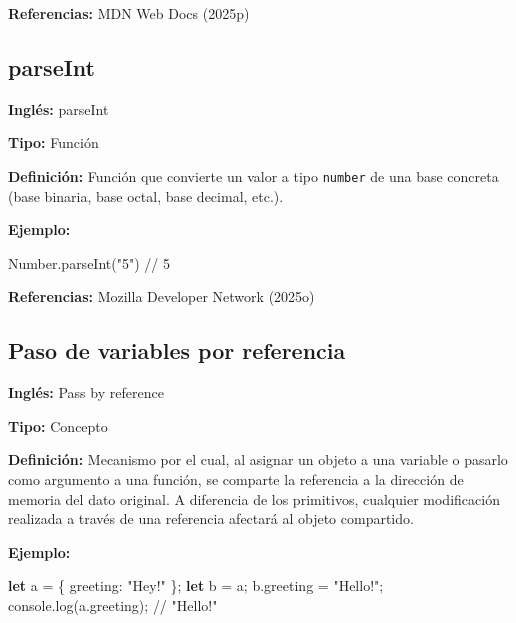 \documentclass[
  letterpaper,
  DIV=11,
  numbers=noendperiod]{scrreprt}
\newenvironment{Shaded}{\begin{snugshade}}{\end{snugshade}}
\newcommand{\AttributeTok}[1]{\textcolor[rgb]{0.40,0.45,0.13}{#1}}
\newcommand{\BuiltInTok}[1]{\textcolor[rgb]{0.00,0.23,0.31}{#1}}
\newcommand{\CommentTok}[1]{\textcolor[rgb]{0.37,0.37,0.37}{#1}}
\newcommand{\DataTypeTok}[1]{\textcolor[rgb]{0.68,0.00,0.00}{#1}}
\newcommand{\FunctionTok}[1]{\textcolor[rgb]{0.28,0.35,0.67}{#1}}
\newcommand{\KeywordTok}[1]{\textcolor[rgb]{0.00,0.23,0.31}{\textbf{#1}}}
\newcommand{\NormalTok}[1]{\textcolor[rgb]{0.00,0.23,0.31}{#1}}
\newcommand{\OperatorTok}[1]{\textcolor[rgb]{0.37,0.37,0.37}{#1}}
\newcommand{\StringTok}[1]{\textcolor[rgb]{0.13,0.47,0.30}{#1}}
\let\oldsubsection\subsection
\renewcommand{\subsection}{\phantomsection\oldsubsection}
\begin{document}
\textbf{Referencias:} MDN Web Docs (2025p)

\subsection*{parseInt}\label{glos-parseint}

\textbf{Inglés:} parseInt

\textbf{Tipo:} Función

\textbf{Definición:} Función que convierte un valor a tipo
\texttt{number} de una base concreta (base binaria, base octal, base
decimal, etc.).

\textbf{Ejemplo:}

\begin{Shaded}
\begin{Highlighting}[]
\BuiltInTok{Number}\OperatorTok{.}\FunctionTok{parseInt}\NormalTok{(}\StringTok{"5"}\NormalTok{) }\CommentTok{// 5}
\end{Highlighting}
\end{Shaded}

\textbf{Referencias:} Mozilla Developer Network (2025o)

\subsection*{Paso de variables por referencia}\label{glos-referencia}

\textbf{Inglés:} Pass by reference

\textbf{Tipo:} Concepto

\textbf{Definición:} Mecanismo por el cual, al asignar un objeto a una
variable o pasarlo como argumento a una función, se comparte la
referencia a la dirección de memoria del dato original. A diferencia de
los primitivos, cualquier modificación realizada a través de una
referencia afectará al objeto compartido.

\textbf{Ejemplo:}

\begin{Shaded}
\begin{Highlighting}[]
\KeywordTok{let}\NormalTok{ a }\OperatorTok{=}\NormalTok{ \{ }\DataTypeTok{greeting}\OperatorTok{:} \StringTok{"Hey!"}\NormalTok{ \}}\OperatorTok{;}
\KeywordTok{let}\NormalTok{ b }\OperatorTok{=}\NormalTok{ a}\OperatorTok{;}
\NormalTok{b}\OperatorTok{.}\AttributeTok{greeting} \OperatorTok{=} \StringTok{"Hello!"}\OperatorTok{;}
\BuiltInTok{console}\OperatorTok{.}\FunctionTok{log}\NormalTok{(a}\OperatorTok{.}\AttributeTok{greeting}\NormalTok{)}\OperatorTok{;} \CommentTok{// "Hello!"}
\end{Highlighting}
\end{Shaded}
\end{document}
